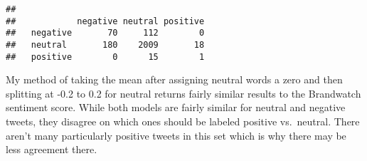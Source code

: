 \documentclass[
]{article}
\begin{document}
\begin{verbatim}
##           
##            negative neutral positive
##   negative       70     112        0
##   neutral       180    2009       18
##   positive        0      15        1
\end{verbatim}

My method of taking the mean after assigning neutral words a zero and
then splitting at -0.2 to 0.2 for neutral returns fairly similar results
to the Brandwatch sentiment score. While both models are fairly similar
for neutral and negative tweets, they disagree on which ones should be
labeled positive vs.~neutral. There aren't many particularly positive
tweets in this set which is why there may be less agreement there.
\end{document}
